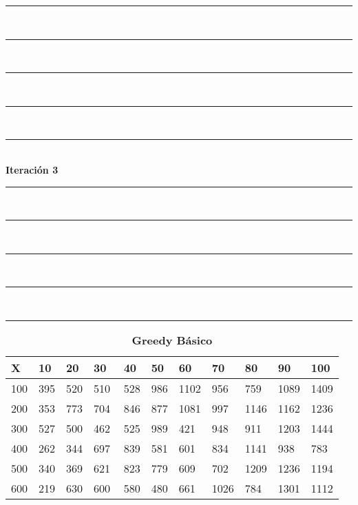 \documentclass[10pt,letterpaper]{article}
\begin{document}
\newpage 
\begin{center}
\newcommand{\HRule}{\rule{\linewidth}{0.5mm}}
\center
\HRule\\[6cm]
\HRule\\[0.4cm]
\HRule\\[0.4cm]
\HRule\\[0.4cm]
\HRule\\[0.4cm]
{\centering \Huge\bfseries Iteración 3}\\[0.4cm]
\HRule\\[0.4cm]
\HRule\\[0.4cm]
\HRule\\[0.4cm]
\HRule\\[6cm]
\HRule
\end{center}
\newpage 
{}
\begin{center}
\begin{table}\renewcommand{\arraystretch}{2.5}
\caption{\large \textbf{Greedy Básico}}
\centering
\begin{tabular} { |m{0.5cm}|m{1.3cm}|m{1.3cm}|m{1.3cm}|m{1.3cm}|m{1.3cm}|m{1.3cm}|m{1.3cm}|m{1.3cm}|m{1.3cm}|m{1.3cm}|} 
\hline
\rowcolor{Gray}
\centering \textbf{X} & \centering \textbf{10} & \centering \textbf{20} & \centering \textbf{30}\ & \centering \textbf{40} & \centering \textbf{50} & \centering \textbf{60}\ & \centering \textbf{70} & \centering \textbf{80} & \centering \textbf{90}\ & \textbf{100} \\\hline
\cellcolor{Gray}100 & \Large 395 & \Large 520 & \Large 510 & \Large 528 & \Large 986 & \Large 1102 & \Large 956 & \Large 759 & \Large 1089 & \Large 1409 \\
\hline
\cellcolor{Gray}200 & \Large 353 & \Large 773 & \Large 704 & \Large 846 & \Large 877 & \Large 1081 & \Large 997 & \Large 1146 & \Large 1162 & \Large 1236 \\
\hline
\cellcolor{Gray}300 & \Large 527 & \Large 500 & \Large 462 & \Large 525 & \Large 989 & \Large 421 & \Large 948 & \Large 911 & \Large 1203 & \Large 1444 \\
\hline
\cellcolor{Gray}400 & \Large 262 & \Large 344 & \Large 697 & \Large 839 & \Large 581 & \Large 601 & \Large 834 & \Large 1141 & \Large 938 & \Large 783 \\
\hline
\cellcolor{Gray}500 & \Large 340 & \Large 369 & \Large 621 & \Large 823 & \Large 779 & \Large 609 & \Large 702 & \Large 1209 & \Large 1236 & \Large 1194 \\
\hline
\cellcolor{Gray}600 & \Large 219 & \Large 630 & \Large 600 & \Large 580 & \Large 480 & \Large 661 & \Large 1026 & \Large 784 & \Large 1301 & \Large 1112 \\

\end{tabular}
\end{table}
\end{center}
\end{document}
